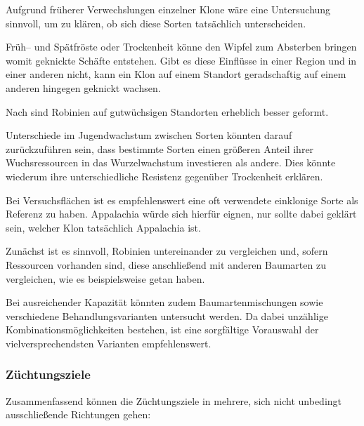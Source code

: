 \documentclass[twocolumn]{scrartcl}
\begin{document}
Aufgrund früherer Verwechslungen einzelner Klone
\citep{heinze2014robinie,liesebach2012robinie} wäre eine Untersuchung
sinnvoll, um zu klären, ob sich diese Sorten tatsächlich
unterscheiden.

Früh-- und Spätfröste oder Trockenheit könne den Wipfel zum Absterben
bringen womit geknickte Schäfte entstehen. Gibt es diese Einflüsse in
einer Region und in einer anderen nicht, kann ein Klon auf einem
Standort geradschaftig auf einem anderen hingegen geknickt wachsen.

Nach \citet[S.~48]{erteld1952robinieErtrag} sind Robinien auf
gutwüchsigen Standorten erheblich besser geformt.

Unterschiede im Jugendwachstum zwischen Sorten könnten darauf
zurückzuführen sein, dass bestimmte Sorten einen größeren Anteil ihrer
Wuchsressourcen in das Wurzelwachstum investieren als andere. Dies
könnte wiederum ihre unterschiedliche Resistenz gegenüber Trockenheit
erklären.

Bei Versuchsflächen ist es empfehlenswert eine oft verwendete
einklonige Sorte als Referenz zu haben. Appalachia würde sich hierfür
eignen, nur sollte dabei geklärt sein, welcher Klon tatsächlich
Appalachia ist.

Zunächst ist es sinnvoll, Robinien untereinander zu vergleichen und,
sofern Ressourcen vorhanden sind, diese anschließend mit anderen
Baumarten zu vergleichen, wie es beispielsweise
\citet{Gruenewald2009robinie} getan haben.

Bei ausreichender Kapazität könnten zudem Baumartenmischungen sowie
verschiedene Behandlungsvarianten untersucht werden. Da dabei
unzählige Kombinationsmöglichkeiten bestehen, ist eine sorgfältige
Vorauswahl der vielversprechendsten Varianten empfehlenswert.

\subsubsection{Züchtungsziele}

Zusammenfassend können die Züchtungsziele in mehrere, sich nicht
unbedingt ausschließende Richtungen gehen:
\end{document}
